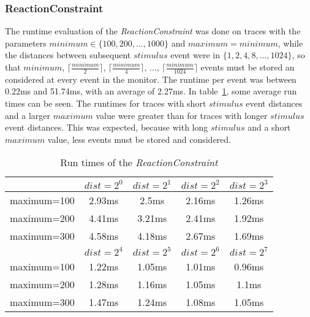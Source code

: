 \subsubsection{ReactionConstraint}
The runtime evaluation of the \textit{ReactionConstraint} was done on traces with the parameters $minimum\in\{100,200,...,1000\}$ and $maximum = minimum$, while the distances between subsequent $stimulus$ event were in $\{1, 2, 4, 8, ..., 1024\}$, so that $minimum$, $\lceil\frac{minimum}{2}\rceil$,  $\lceil\frac{minimum}{4}\rceil$, ...,  $\lceil\frac{minimum}{1024}\rceil$ events must be stored an considered at every event in the monitor. The runtime per event was between 0.22ms and 51.74ms, with an average of 2.27ms. In table~\ref{tab:runtimeReactionConstraint}, some average run times can be seen.
The runtimes for traces with short $stimulus$ event distances and a larger $maximum$ value were greater than for traces with longer $stimulus$ event distances. This was expected, because with long $stimulus$ and a short $maximum$ value, less events must be stored and considered.
\begin{table}
	\begin{tabular}{|c|c|c|c|c|}
		\hline
					 & $dist=2^0$ & $dist=2^1$ & $dist=2^2$ & $dist=2^3$  \\
	 	\hline
	 	maximum=100 & 2.93ms & 2.5ms & 2.16ms & 1.26ms\\
	 	\hline
	 	maximum=200 & 4.41ms & 3.21ms & 2.41ms & 1.92ms\\
	 	\hline
		maximum=300 & 4.58ms & 4.18ms & 2.67ms & 1.69ms\\
		\hline
		\hline
					 & $dist=2^4$ & $dist=2^5$ &$dist=2^6$ & $dist=2^7$\\
		\hline
		maximum=100 & 1.22ms & 1.05ms & 1.01ms & 0.96ms\\
		\hline
		maximum=200 & 1.28ms & 1.16ms & 1.05ms & 1.1ms\\
		\hline
		maximum=300 & 1.47ms & 1.24ms & 1.08ms & 1.05ms\\
		\hline
	\end{tabular}
	\centering
	\caption{Run times of the \textit{ReactionConstraint}}
	\label{tab:runtimeReactionConstraint}
\end{table}

